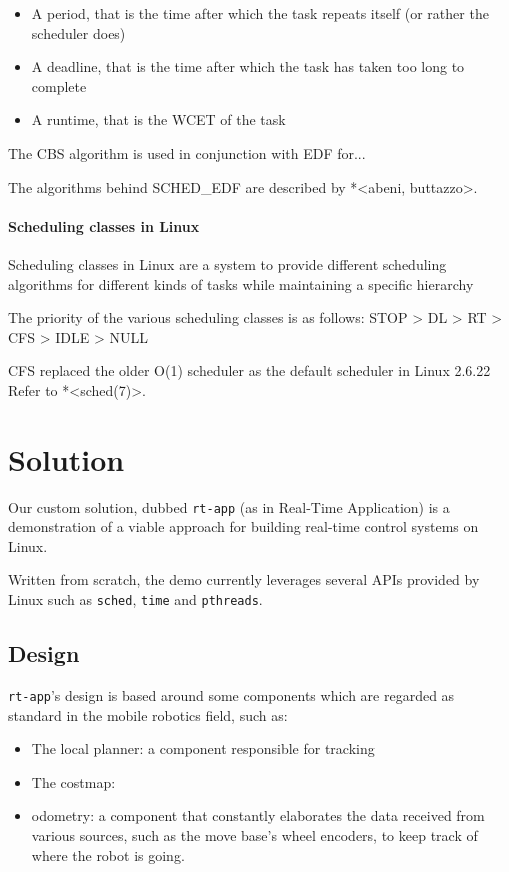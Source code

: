 \documentclass[a4paper,12pt]{report}
\begin{document}
\begin{itemize}
    \item A period, that is the time after which the task repeats itself (or rather the scheduler does)
    \item A deadline, that is the time after which the task has taken too long to complete
    \item A runtime, that is the WCET of the task
\end{itemize}

The CBS algorithm is used in conjunction with EDF for...

The algorithms behind SCHED\_EDF are described by *<abeni, buttazzo>.

\subsubsection{Scheduling classes in Linux}

Scheduling classes in Linux are a system to provide different scheduling algorithms for different kinds of tasks while maintaining a specific hierarchy 

The priority of the various scheduling classes is as follows:
STOP > DL > RT > CFS > IDLE > NULL

CFS replaced the older O(1) scheduler as the default scheduler in Linux 2.6.22 %
Refer to *<sched(7)>.

\newpage
\chapter{Solution}

Our custom solution, dubbed \texttt{rt-app} (as in Real-Time Application) is a demonstration of a viable approach for building real-time control systems on Linux.

Written from scratch, the demo currently leverages several APIs provided by Linux such as \texttt{sched}, \texttt{time} and \texttt{pthreads}.

\section{Design}

\texttt{rt-app}'s design is based around some components which are regarded as 
standard in the mobile robotics field, such as:
\begin{itemize}
  \item The local planner: a component responsible for tracking
  \item The costmap:
  \item odometry: a component that constantly elaborates the data received from various sources, such as the move base's wheel encoders, to keep track of where the robot is going.
\end{itemize}
\end{document}
